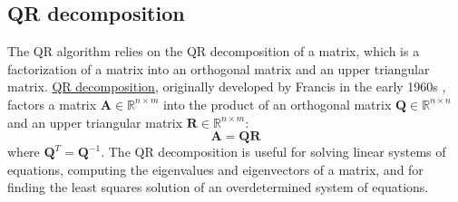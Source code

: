 \documentclass{article}[11pt]
\begin{document}
\subsection{QR decomposition}
The QR algorithm relies on the QR decomposition of a matrix, which is a factorization of a matrix into an orthogonal matrix and an upper triangular matrix.
\href{https://en.wikipedia.org/wiki/QR_decomposition}{QR decomposition}, originally developed by Francis in the early 1960s \cite{Francis-QR-1961, Francis-QR-1962}, factors a matrix $\mathbf{A}\in\mathbb{R}^{n\times{m}}$ 
into the product of an orthogonal matrix $\mathbf{Q}\in\mathbb{R}^{n\times{n}}$ and 
an upper triangular matrix $\mathbf{R}\in\mathbb{R}^{n\times{m}}$:
\begin{equation}
\mathbf{A} = \mathbf{Q}\mathbf{R}
\end{equation}
where $\mathbf{Q}^{T} = \mathbf{Q}^{-1}$. 
The QR decomposition is useful for solving linear systems of equations, computing the eigenvalues and eigenvectors of a matrix, and for finding the least squares solution of an overdetermined system of equations.
\end{document}
